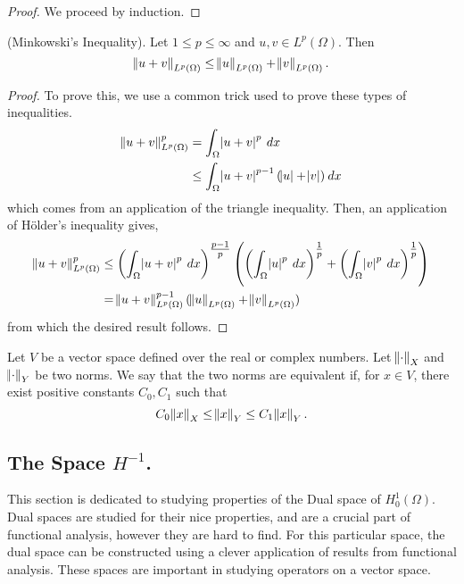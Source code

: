 \documentclass[10pt]{article}
\begin{document}
\begin{proof}
	We proceed by induction. 
\end{proof}
\begin{lemma}
	(Minkowski's Inequality). Let $1 \leq p \leq \infty$ and $u, v \in L^p(\Omega)$. Then 
	\begin{equation*}
		\displaystyle \norm{u + v}_{L^p(\Omega)} \leq \norm{u}_{L^p(\Omega)} + \norm{v}_{L^p(\Omega)}.
	\end{equation*}
\end{lemma}
\begin{proof}
	To prove this, we use a common trick used to prove these types of inequalities. 
	\begin{align*}
		\displaystyle \norm{u + v}_{L^p(\Omega)}^p &= \int_{\Omega}{\abs{u + v}^p \: dx} \\
		&\leq \int_{\Omega}{\abs{u + v}^{p-1}(\abs{u} + \abs{v}) \: dx} 
	\end{align*}
	which comes from an application of the triangle inequality. Then, an application of H\"older's inequality gives,
	\begin{align*}
		\displaystyle \norm{u + v}_{L^p(\Omega)}^p &\leq \left(\int_{\Omega}{\abs{u + v}^p \: dx}\right)^{\tfrac{p-1}{p}}\left(\left(\int_{\Omega}{\abs{u}^p \: dx}\right)^{\tfrac{1}{p}}+ \left(\int_{\Omega}{\abs{v}^p \: dx}\right)^{\tfrac{1}{p}}\right) \\
		&= \norm{u + v}_{L^p(\Omega)}^{p-1}(\norm{u}_{L^p(\Omega)} + \norm{v}_{L^p(\Omega)})
	\end{align*}
	from which the desired result follows. 
\end{proof}
\begin{definition}
	Let $V$ be a vector space defined over the real or complex numbers. Let $\norm{\cdot}_{X}$ and $\norm{\cdot}_{Y}$ be two norms. We say that the two norms are equivalent if, for $x \in V$, there exist positive constants $C_0,C_1$ such that 
	\begin{equation*}
		\displaystyle C_0\norm{x}_{X} \leq \norm{x}_{Y} \leq C_1\norm{x}_Y.
 	\end{equation*}
\end{definition}
\subsection{The Space $H^{-1}$.}
This section is dedicated to studying properties of the Dual space of $H_0^1(\Omega)$. Dual spaces are studied for their nice properties, and are a crucial part of functional analysis, however they are hard to find. For this particular space, the dual space can be constructed using a clever application of results from functional analysis. These spaces are important in studying operators on a vector space. 
\end{document}
